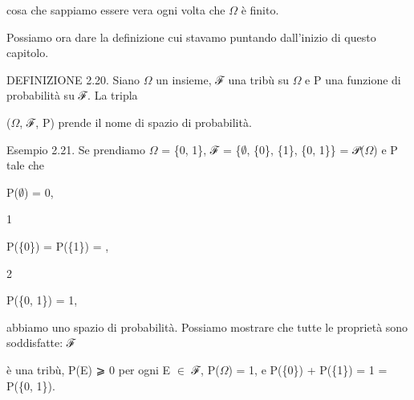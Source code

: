 \documentclass[a4paper,portrait,12pt]{article}
\begin{document}
\begin{flushleft}
cosa che sappiamo essere vera ogni volta che $\Omega$ \`{e} finito.
\end{flushleft}


\begin{flushleft}
Possiamo ora dare la definizione cui stavamo puntando dall'inizio di questo capitolo.
\end{flushleft}


\begin{flushleft}
DEFINIZIONE 2.20. Siano $\Omega$ un insieme, ℱ una tribù su $\Omega$ e P una funzione di probabilit\`{a} su ℱ. La tripla
\end{flushleft}


\begin{flushleft}
($\Omega$, ℱ, P) prende il nome di spazio di probabilit\`{a}.
\end{flushleft}


\begin{flushleft}
Esempio 2.21. Se prendiamo $\Omega$ = \{0, 1\}, ℱ = \{$\emptyset$, \{0\}, \{1\}, \{0, 1\}\} = 𝒫($\Omega$) e P tale che
\end{flushleft}


\begin{flushleft}
P($\emptyset$) = 0,
\end{flushleft}





1


\begin{flushleft}
P(\{0\}) = P(\{1\}) = ,
\end{flushleft}


2





\begin{flushleft}
P(\{0, 1\}) = 1,
\end{flushleft}





\begin{flushleft}
abbiamo uno spazio di probabilit\`{a}. Possiamo mostrare che tutte le propriet\`{a} sono soddisfatte: ℱ
\end{flushleft}


\begin{flushleft}
\`{e} una tribù, P(E) ⩾ 0 per ogni E $\in$ ℱ, P($\Omega$) = 1, e P(\{0\}) + P(\{1\}) = 1 = P(\{0, 1\}).
\end{flushleft}
\end{document}
